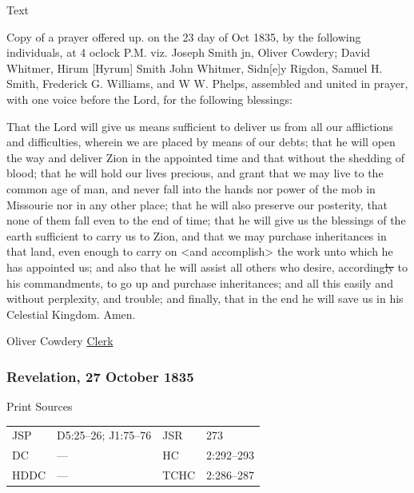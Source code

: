 			\begin{description}
				\item[Text]
			\end{description}
			
				Copy of a prayer offered up. on the 23 day of Oct 1835, by the following individuals, at 4 oclock P.M. viz. Joseph Smith jn, Oliver Cowdery; David Whitmer, Hirum [Hyrum] Smith John Whitmer, Sidn[e]y Rigdon, Samuel H. Smith, Frederick G. Williams, and W W. Phelps, assembled and united in prayer, with one voice before the Lord, for the following blessings:
				
				That the Lord will give us means sufficient to deliver us from all our afflictions and difficulties, wherein we are placed by means of our debts; that he will open the way and deliver Zion in the appointed time and that without the shedding of blood; that he will hold our lives precious, and grant that we may live to the common age of man, and never fall into the hands nor power of the mob in Missourie nor in any other place; that he will also preserve our posterity, that none of them fall even to the end of time; that he will give us the blessings of the earth sufficient to carry us to Zion, and that we may purchase inheritances in that land, even enough to carry on <and accomplish> the work unto which he has appointed us; and also that he will assist all others who desire, according\sout{ly} to his commandments, to go up and purchase inheritances; and all this easily and without perplexity, and trouble; and finally, that in the end he will save us in his Celestial Kingdom. Amen.
				
				\begin{tightright}
				Oliver Cowdery \uline{Clerk}
				\end{tightright}
				
		\subsubsection{Revelation, 27 October 1835}
			\label{EMS-1835-JS-27-OCT-1835}
			
			\begin{description}
				\item[Print Sources]
			\end{description}

				\begin{tabular}{p{0.5in}p{1in}p{0.5in}p{1in}}
				JSP	 	& D5:25--26; J1:75--76	& JSR 		& 273 \\
				DC	 	& --- 			& HC 		& 2:292--293 \\
				HDDC 	& ---			& TCHC 		& 2:286--287 \\
				\end{tabular}
			
